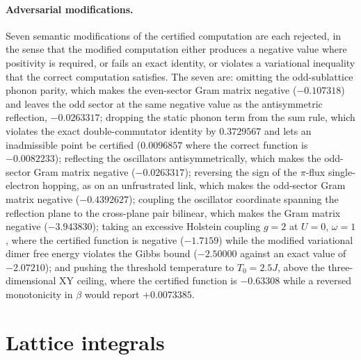 \documentclass[11pt]{article}
\numberwithin{equation}{section}
\theoremstyle{definition}
\begin{document}
\paragraph{Adversarial modifications.}
Seven semantic modifications of the certified computation are each rejected, in the sense
that the modified computation either produces a negative value where positivity is
required, or fails an exact identity, or violates a variational inequality that the correct
computation satisfies. The seven are: omitting the odd-sublattice phonon parity, which
makes the even-sector Gram matrix negative ($-0.107318$) and leaves the odd sector at the
same negative value as the antisymmetric reflection, $-0.0263317$; dropping the static
phonon term from the sum rule, which violates the exact double-commutator identity by
$0.3729567$ and lets an inadmissible point be certified ($0.0096857$ where the correct
function is $-0.0082233$); reflecting the
oscillators antisymmetrically, which makes the odd-sector Gram matrix negative
($-0.0263317$); reversing the sign of the $\pi$-flux single-electron hopping, as on an
unfrustrated link, which makes the
odd-sector Gram matrix negative ($-0.4392627$); coupling the oscillator coordinate
spanning the reflection plane to the cross-plane pair bilinear, which makes the Gram
matrix negative ($-3.943830$); taking an excessive Holstein coupling $g=2$ at $U=0$,
$\omega=1$, where the certified function is negative ($-1.7159$) while the modified
variational dimer free energy violates the Gibbs bound ($-2.50000$ against an exact value
of $-2.07210$); and pushing the threshold temperature to $T_0=2.5J$, above the
three-dimensional XY ceiling, where the certified function is $-0.63308$ while a reversed
monotonicity in $\beta$ would report $+0.0073385$.

\section{Lattice integrals}\label{app:integrals}
\end{document}
